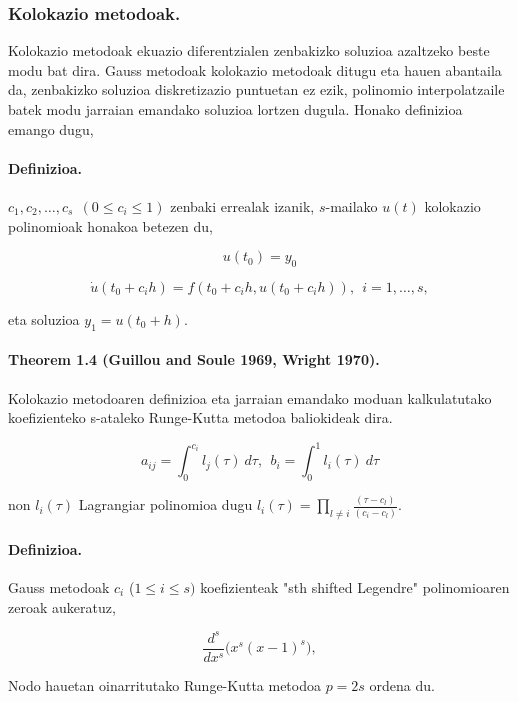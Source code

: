 \subsubsection{Kolokazio metodoak.}

Kolokazio metodoak ekuazio diferentzialen zenbakizko soluzioa azaltzeko beste modu bat dira. Gauss metodoak kolokazio metodoak ditugu eta hauen abantaila da, zenbakizko soluzioa diskretizazio puntuetan ez ezik, polinomio interpolatzaile batek modu jarraian emandako soluzioa lortzen dugula. Honako definizioa emango dugu,

\paragraph{\textbf{Definizioa.}} $c_1,c_2,\dots,c_s \ \ (0\leq c_i \leq 1)$ zenbaki errealak izanik, $s$-mailako $u(t)$   kolokazio polinomioak honakoa betezen du,

\[u(t_0)=y_0 \]

\[\dot{u}(t_0+c_ih)=f(t_0+c_i h, u(t_0+c_i h)), \ \ i=1,\dots,s,\] 

eta soluzioa $y_1=u(t_0+h)$.

\paragraph {\textbf{Theorem 1.4} (Guillou and Soule 1969, Wright 1970).}
Kolokazio metodoaren definizioa eta jarraian emandako moduan kalkulatutako koefizienteko s-ataleko Runge-Kutta metodoa baliokideak dira.

\begin{equation}
a_{ij}=\int_{0}^{c_i} l_j(\tau) \ d\tau, \ \ b_i=\int_{0}^{1} l_i(\tau) \ d\tau
\end{equation}

non $l_i(\tau)$ Lagrangiar polinomioa dugu $l_i(\tau)=\prod_{l\neq i} \frac{(\tau-c_l)}{(c_i-c_l)}$.

\paragraph{\textbf{Definizioa}.} Gauss metodoak $c_i$ ($1 \leq i \leq s)$ koefizienteak "sth shifted Legendre" polinomioaren zeroak aukeratuz,

\begin{equation*}
\frac{d^s}{dx^s} \big(x^s(x-1)^s \big),
\end{equation*} 

Nodo hauetan oinarritutako Runge-Kutta metodoa $p=2s$ ordena du.

